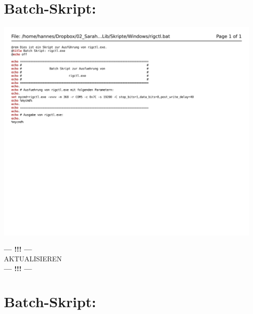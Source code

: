
\chapter{Batch-Skript: }
\label{chap:rigctlbat}

\begin{center}
	\includegraphics[width=1\textwidth]{./appendicies/rigctl}
\end{center}

\begin{center}
	\Large{\textbf{--- !!! ---}\\AKTUALISIEREN\\\textbf{--- !!! ---}}
\end{center}


\chapter{Batch-Skript: }
\label{chap:rotctldbat}

